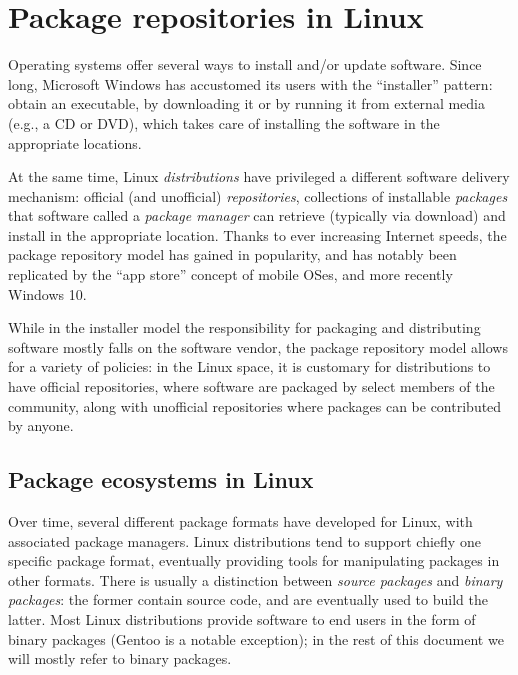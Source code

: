 \documentclass{deliverablereport}
\author{
  Nicolas M. Thiéry,
  Viviane Pons,
  Florent Hivert,
  Samuel Lelièvre,
  Erik Bray,
  Loïc Gouarin,
  Florian Rabe,
  Vincent Delecroix,
  Vincent Klein,
  Clément Pernet,
  Jean-Guillaume Dumas,
  Daniel Schultz,
  Dmitrii Pasechnik
  Steve Linton,
  Alexander Konovalov,
  Markus Pfeiffer,
  Michael Torpey,
  Luca De Feo,
  John E. Cremona,
  Olivier Cayrol,
  Julien Cristau,
  Jeroen Demeyer,
  \dots
}
\begin{document}
\maketitle
\githubissuedescription

\section{Package repositories in Linux}

Operating systems offer several ways to install and/or update
software. %
Since long, Microsoft Windows has accustomed its users with the
``installer'' pattern: obtain an executable, by downloading it or by
running it from external media (e.g., a CD or DVD), which takes care
of installing the software in the appropriate locations.

At the same time, Linux \emph{distributions} have privileged a
different software delivery mechanism: official (and unofficial)
\emph{repositories}, collections of installable \emph{packages} that
software called a \emph{package manager} can retrieve (typically via
download) and install in the appropriate location. %
Thanks to ever increasing Internet speeds, the package repository
model has gained in popularity, and has notably been replicated by the
``app store'' concept of mobile OSes, and more recently Windows 10.

While in the installer model the responsibility for packaging and
distributing software mostly falls on the software vendor, the package
repository model allows for a variety of policies: in the Linux space,
it is customary for distributions to have official repositories, where
software are packaged by select members of the community, along with
unofficial repositories where packages can be contributed by anyone.

\subsection{Package ecosystems in Linux}

Over time, several different package formats have developed for Linux,
with associated package managers. %
Linux distributions tend to support chiefly one specific package
format, eventually providing tools for manipulating packages in other
formats. %
There is usually a distinction between \emph{source packages} and
\emph{binary packages}: the former contain source code, and are
eventually used to build the latter. %
Most Linux distributions provide software to end users in the form of
binary packages (Gentoo is a notable exception); in the rest of this
document we will mostly refer to binary packages.
\end{document}
